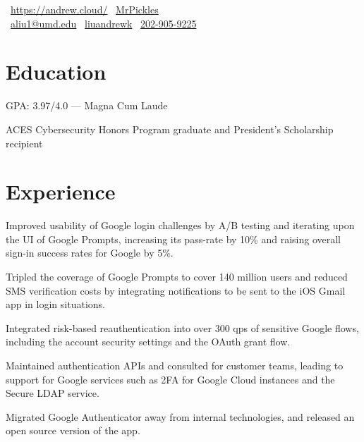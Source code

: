 \documentclass[]{template}
\begin{document}
\lastupdated

{
  \faHome \, \url{https://andrew.cloud/}
  \textcolor{white}{\textbullet} %
  \faGithub \, \href{https://github.com/MrPickles}{MrPickles}
  \\ %
  \faEnvelope \, \href{mailto:aliu1@umd.edu}{aliu1@umd.edu}
  \textcolor{white}{\textbullet} %
  \faLinkedin \, \href{https://linkedin.com/in/liuandrewk}{liuandrewk}
  \textcolor{white}{\textbullet} %
  \faPhone \, \href{tel:2029059225}{202-905-9225}
}

\section{Education}
\begin{tightemize}
\item GPA: 3.97/4.0 --- Magna Cum Laude
\item ACES Cybersecurity Honors Program graduate
      and President's Scholarship recipient
\end{tightemize}
\sectionsep

\section{Experience}

\begin{tightemize}
\item
  Improved usability of Google login challenges by A/B testing and iterating
  upon the UI of Google Prompts, increasing its pass-rate by 10\% and raising
  overall sign-in success rates for Google by 5\%.
\item
  Tripled the coverage of Google Prompts to cover 140 million users and reduced
  SMS verification costs by integrating notifications to be sent to the iOS
  Gmail app in login situations.
\item
  Integrated risk-based reauthentication into over 300 qps of sensitive Google
  flows, including the account security settings and the OAuth grant flow.
\item
  Maintained authentication APIs and consulted for customer teams, leading to
  support for Google services such as 2FA for Google Cloud instances and the
  Secure LDAP service.
\item
  Migrated Google Authenticator away from internal technologies, and released an
  open source version of the app.
\end{tightemize}
\sectionsep
\end{document}

